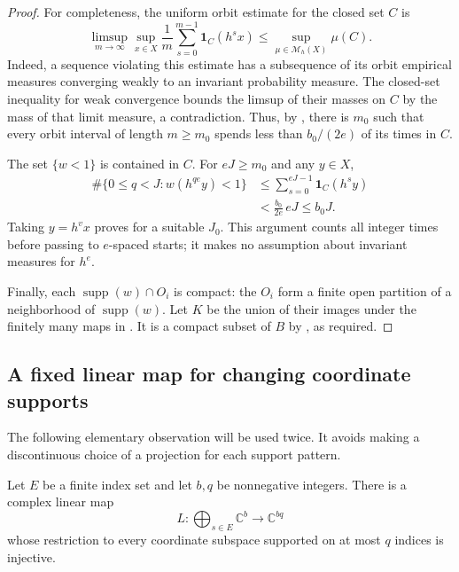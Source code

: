 \begin{proof}
For completeness, the uniform orbit estimate for the closed set $C$ is
\begin{equation}
\label{eq:closed-set-uniform-orbit-estimate}
 \limsup_{m\to\infty}\sup_{x\in X}\frac1m
       \sum_{s=0}^{m-1}\mathbf 1_C(h^sx)
 \leq\sup_{\mu\in\mathcal M_h(X)}\mu(C).
\end{equation}
Indeed, a sequence violating this estimate has a subsequence of its
orbit empirical measures converging weakly to an invariant probability
measure.  The closed-set inequality for weak convergence bounds the
limsup of their masses on $C$ by the mass of that limit measure, a
contradiction.  Thus, by
,
there is $m_0$ such that every orbit interval of length $m\geq m_0$
spends less than $b_0/(2e)$ of its times in $C$.

The set $\{w<1\}$ is contained in $C$.  For $eJ\geq m_0$ and any
$y\in X$,
\[
 \begin{split}
 \#\{0\leq q<J:w(h^{qe}y)<1\}
 &\leq\sum_{s=0}^{eJ-1}\mathbf 1_C(h^sy)\\
 &<\frac{b_0}{2e}\,eJ\leq b_0J.
 \end{split}
\]
Taking $y=h^vx$ proves  for a suitable
$J_0$.  This argument counts all integer times before passing to
$e$-spaced starts; it makes no assumption about invariant measures for
$h^e$.

Finally, each $\operatorname{supp}(w)\cap O_i$ is compact: the $O_i$
form a finite open partition of a neighborhood of
$\operatorname{supp}(w)$.  Let $K$ be the union of their images under
the finitely many maps in .
It is a compact subset of $B$ by
, as required.
\end{proof}

\subsection{A fixed linear map for changing coordinate supports}

The following elementary observation will be used twice.  It avoids
making a discontinuous choice of a projection for each support pattern.

\begin{lemma}
\label{lem:finite-coordinate-compression}
Let $E$ be a finite index set and let $b,q$ be nonnegative integers.
There is a complex linear map
\[
 L:\bigoplus_{s\in E}\mathbb C^b\longrightarrow\mathbb C^{bq}
\]
whose restriction to every coordinate subspace supported on at most
$q$ indices is injective.
\end{lemma}


